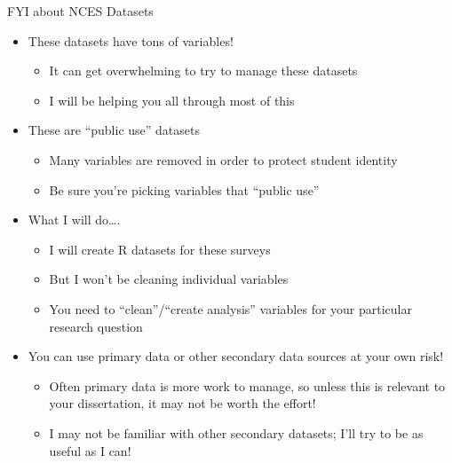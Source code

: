 \documentclass[
  8pt,
  ignorenonframetext,
  dvipsnames]{beamer}
\providecommand{\tightlist}{%
  \setlength{\itemsep}{0pt}\setlength{\parskip}{0pt}}
\let\olditem\item
\renewcommand{\item}{%
  \olditem\vspace{4pt}
}
\begin{document}
\begin{frame}{FYI about NCES Datasets}
\protect\hypertarget{fyi-about-nces-datasets}{}

\begin{itemize}
\tightlist
\item
  These datasets have tons of variables!

  \begin{itemize}
  \tightlist
  \item
    It can get overwhelming to try to manage these datasets
  \item
    I will be helping you all through most of this
  \end{itemize}
\item
  These are ``public use'' datasets

  \begin{itemize}
  \tightlist
  \item
    Many variables are removed in order to protect student identity
  \item
    Be sure you're picking variables that ``public use''
  \end{itemize}
\item
  What I will do\ldots.

  \begin{itemize}
  \tightlist
  \item
    I will create R datasets for these surveys
  \item
    But I won't be cleaning individual variables
  \item
    You need to ``clean''/``create analysis'' variables for your
    particular research question
  \end{itemize}
\end{itemize}

\medskip

\begin{itemize}
\tightlist
\item
  You can use primary data or other secondary data sources at your own
  risk!

  \begin{itemize}
  \tightlist
  \item
    Often primary data is more work to manage, so unless this is
    relevant to your dissertation, it may not be worth the effort!
  \item
    I may not be familiar with other secondary datasets; I'll try to be
    as useful as I can!
  \end{itemize}
\end{itemize}

\end{frame}
\end{document}
